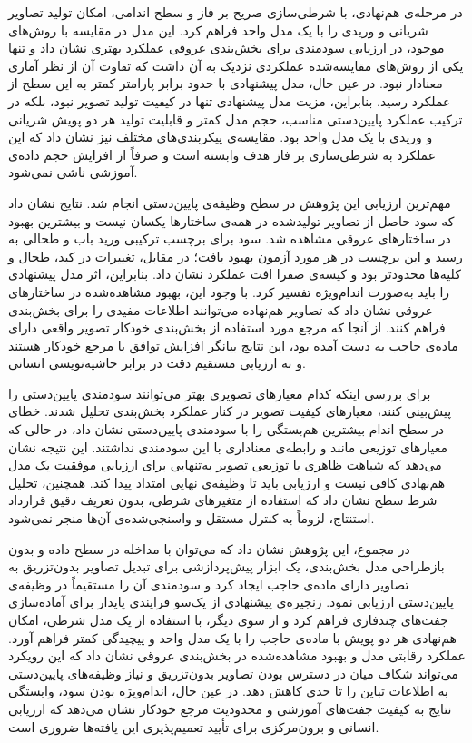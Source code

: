 در مرحله‌ی هم‌نهادی،  با شرطی‌سازی صریح بر فاز و سطح اندامی، امکان تولید تصاویر شریانی و وریدی را با یک مدل واحد فراهم کرد. این مدل در مقایسه با روش‌های موجود، در ارزیابی سودمندی برای بخش‌بندی عروقی عملکرد بهتری نشان داد و تنها یکی از روش‌های مقایسه‌شده عملکردی نزدیک به آن داشت که تفاوت آن از نظر آماری معنادار نبود. در عین حال، مدل پیشنهادی با حدود  برابر پارامتر کمتر به این سطح از عملکرد رسید. بنابراین، مزیت مدل پیشنهادی تنها در کیفیت تولید تصویر نبود، بلکه در ترکیب عملکرد پایین‌دستی مناسب، حجم مدل کمتر و قابلیت تولید هر دو پویش شریانی و وریدی با یک مدل واحد بود. مقایسه‌ی پیکربندی‌های مختلف نیز نشان داد که این عملکرد به شرطی‌سازی بر فاز هدف وابسته است و صرفاً از افزایش حجم داده‌ی آموزشی ناشی نمی‌شود.

مهم‌ترین ارزیابی این پژوهش در سطح وظیفه‌ی پایین‌دستی انجام شد. نتایج نشان داد که سود حاصل از تصاویر تولیدشده در همه‌ی ساختارها یکسان نیست و بیشترین بهبود در ساختارهای عروقی مشاهده شد. سود  برای برچسب ترکیبی ورید باب و طحالی به  رسید و این برچسب در هر  مورد آزمون بهبود یافت؛ در مقابل، تغییرات در کبد، طحال و کلیه‌ها محدودتر بود و کیسه‌ی صفرا افت عملکرد نشان داد. بنابراین، اثر مدل پیشنهادی را باید به‌صورت اندام‌ویژه تفسیر کرد. با وجود این، بهبود مشاهده‌شده در ساختارهای عروقی نشان داد که تصاویر هم‌نهاده می‌توانند اطلاعات مفیدی را برای بخش‌بندی فراهم کنند. از آنجا که مرجع مورد استفاده از بخش‌بندی خودکار تصویر واقعی دارای ماده‌ی حاجب به دست آمده بود، این نتایج بیانگر افزایش توافق با مرجع خودکار هستند و نه ارزیابی مستقیم دقت در برابر حاشیه‌نویسی انسانی.

برای بررسی اینکه کدام معیارهای تصویری بهتر می‌توانند سودمندی پایین‌دستی را پیش‌بینی کنند، معیارهای کیفیت تصویر در کنار عملکرد بخش‌بندی تحلیل شدند. خطای  در سطح اندام بیشترین هم‌بستگی را با سودمندی پایین‌دستی نشان داد، در حالی که معیارهای توزیعی مانند  و  رابطه‌ی معناداری با این سودمندی نداشتند. این نتیجه نشان می‌دهد که شباهت ظاهری یا توزیعی تصویر به‌تنهایی برای ارزیابی موفقیت یک مدل هم‌نهادی کافی نیست و ارزیابی باید تا وظیفه‌ی نهایی امتداد پیدا کند. همچنین، تحلیل شرط سطح نشان داد که استفاده از متغیرهای شرطی، بدون تعریف دقیق قرارداد استنتاج، لزوماً به کنترل مستقل و واسنجی‌شده‌ی آن‌ها منجر نمی‌شود.

در مجموع، این پژوهش نشان داد که می‌توان با مداخله در سطح داده و بدون بازطراحی مدل بخش‌بندی، یک ابزار پیش‌پردازشی برای تبدیل تصاویر بدون‌تزریق به تصاویر دارای ماده‌ی حاجب ایجاد کرد و سودمندی آن را مستقیماً در وظیفه‌ی پایین‌دستی ارزیابی نمود. زنجیره‌ی پیشنهادی از یک‌سو فرایندی پایدار برای آماده‌سازی جفت‌های چندفازی فراهم کرد و از سوی دیگر، با استفاده از یک مدل شرطی، امکان هم‌نهادی هر دو پویش با ماده‌ی حاجب را با یک مدل واحد و پیچیدگی کمتر فراهم آورد. عملکرد رقابتی مدل و بهبود مشاهده‌شده در بخش‌بندی عروقی نشان داد که این رویکرد می‌تواند شکاف میان در دسترس بودن تصاویر بدون‌تزریق و نیاز وظیفه‌های پایین‌دستی به اطلاعات تباین را تا حدی کاهش دهد. در عین حال، اندام‌ویژه بودن سود، وابستگی نتایج به کیفیت جفت‌های آموزشی و محدودیت مرجع خودکار نشان می‌دهد که ارزیابی انسانی و برون‌مرکزی برای تأیید تعمیم‌پذیری این یافته‌ها ضروری است.

